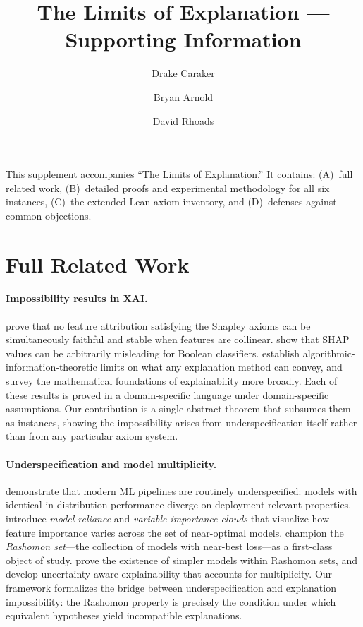 \documentclass{article}
\title{The Limits of Explanation --- Supporting Information}
\author{Drake Caraker \and Bryan Arnold \and David Rhoads}
\begin{document}
\maketitle

This supplement accompanies ``The Limits of Explanation.'' It contains: (A)~full related work, (B)~detailed proofs and experimental methodology for all six instances, (C)~the extended Lean axiom inventory, and (D)~defenses against common objections.

\section{Full Related Work}
\label{sec:related}

\paragraph{Impossibility results in XAI.}
\citet{bilodeau2024impossibility} prove that no feature attribution satisfying
the Shapley axioms can be simultaneously faithful and stable when features are
collinear.  \citet{huang2024failings} show that SHAP values can be arbitrarily
misleading for Boolean classifiers.  \citet{rao2025limits} establish
algorithmic-information-theoretic limits on what any explanation method can
convey, and \citet{noguer2025mathematical} survey the mathematical foundations
of explainability more broadly.  Each of these results is proved in a
domain-specific language under domain-specific assumptions.  Our contribution
is a single abstract theorem that subsumes them as instances, showing the
impossibility arises from underspecification itself rather than from any
particular axiom system.

\paragraph{Underspecification and model multiplicity.}
\citet{damour2022underspecification} demonstrate that modern ML pipelines are
routinely underspecified: models with identical in-distribution performance
diverge on deployment-relevant properties.
\citet{fisher2019models} introduce \emph{model reliance} and
\emph{variable-importance clouds} that visualize how feature importance varies
across the set of near-optimal models.
\citet{rudin2024amazing} champion the \emph{Rashomon set}---the collection of
models with near-best loss---as a first-class object of study.
\citet{semenova2022existence} prove the existence of simpler models within
Rashomon sets, and \citet{marx2024uncertainty} develop uncertainty-aware
explainability that accounts for multiplicity.  Our framework formalizes the
bridge between underspecification and explanation impossibility: the Rashomon
property is precisely the condition under which
equivalent hypotheses yield incompatible explanations.
\end{document}
